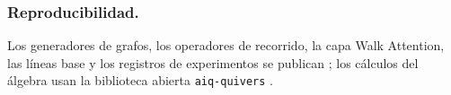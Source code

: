 \documentclass[runningheads]{llncs}
\begin{document}
\subsubsection*{Reproducibilidad.}
Los generadores de grafos, los operadores de recorrido, la capa Walk Attention,
las líneas base y los registros de experimentos se publican
\cite{repo_walkattention}; los cálculos del álgebra usan la biblioteca abierta
\texttt{aiq-quivers} \cite{repo_aiqquivers}.



\end{document}
